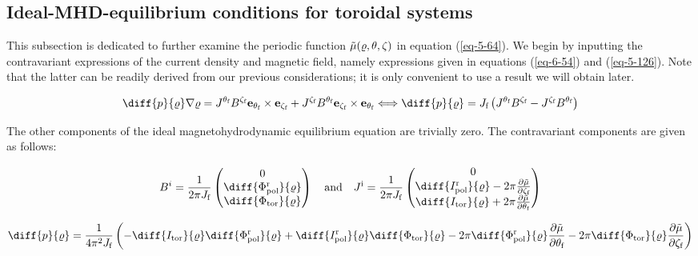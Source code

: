 \subsection{Ideal-MHD-equilibrium conditions for toroidal systems}

\label{mhd-conditions}

This subsection is dedicated to further examine the periodic function $\Tilde{\mu}(\varrho,\theta,\zeta)$ in equation (\ref{eq-5-64}). We begin by inputting the contravariant expressions of the current density and magnetic field, namely expressions given in equations (\ref{eq-6-54}) and (\ref{eq-5-126}). Note that the latter can be readily derived from our previous considerations; it is only convenient to use a result we will obtain later.

\begin{equation}
    \diff{p}{\varrho}\nabla\varrho=J^{\theta_\text{f}}B^{\zeta_\text{f}}\mathbf{e}_{\theta_\text{f}}\times\mathbf{e}_{\zeta_\text{f}}+J^{\zeta_\text{f}}B^{\theta_\text{f}}\mathbf{e}_{\zeta_\text{f}}\times\mathbf{e}_{\theta_\text{f}}\Longleftrightarrow\diff{p}{\varrho}=J_\text{f}\left(J^{\theta_\text{f}}B^{\zeta_\text{f}}-J^{\zeta_\text{f}}B^{\theta_\text{f}}\right)
\end{equation}

The other components of the ideal magnetohydrodynamic equilibrium equation are trivially zero. The contravariant components are given as follows:

\begin{equation}
    B^i=\frac{1}{2\pi J_\text{f}}\begin{pmatrix}
        0\\\diff{\Phi_\text{pol}^\text{r}}{\varrho}\\\diff{\Phi_\text{tor}}{\varrho}        
    \end{pmatrix}\quad\text{and}\quad J^\mathrm{i}=\frac{1}{2\pi J_\text{f}}\begin{pmatrix}
        0\\\diff{I_\text{pol}^\text{r}}{\varrho}-2\pi\frac{\partial\Tilde{\mu}}{\partial\zeta_\text{f}}\\
        \diff{I_\text{tor}}{\varrho}+2\pi\frac{\partial\Tilde{\mu}}{\partial\theta_\text{f}}
    \end{pmatrix}
\end{equation}

\begin{equation}
    \diff{p}{\varrho}=\frac{1}{4\pi^2J_\text{f}}\left(-\diff{I_\text{tor}}{\varrho}\diff{\Phi_\text{pol}^\text{r}}{\varrho}+\diff{I_\text{pol}^\text{r}}{\varrho}\diff{\Phi_\text{tor}}{\varrho}-2\pi\diff{\Phi_\text{pol}^\text{r}}{\varrho}\frac{\partial\Tilde{\mu}}{\partial\theta_\text{f}}-2\pi\diff{\Phi_\text{tor}}{\varrho}\frac{\partial\Tilde{\mu}}{\partial\zeta_\text{f}}\right)
\end{equation}

